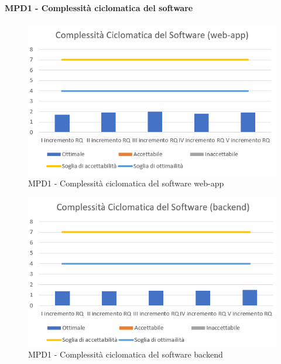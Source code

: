   \paragraph{MPD1 - Complessità ciclomatica del software}
  \begin{figure}[h!]
    \centering
      \includegraphics[scale=1]{Immagini/CicloCompl WA.PNG}
    \caption{MPD1 - Complessità ciclomatica del software web-app}
  \end{figure}

  \begin{figure}[h!]
    \centering
      \includegraphics[scale=1]{Immagini/CicloCompl BE.PNG}
    \caption{MPD1 - Complessità ciclomatica del software backend}
  \end{figure}


